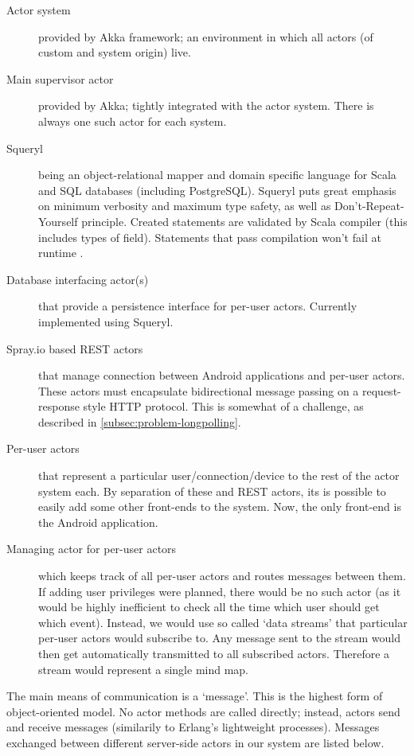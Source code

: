 \begin{description}
	\item[Actor system]{provided by Akka framework; an environment in which all actors (of custom and system origin) live.}
	\item[Main supervisor actor]{provided by Akka; tightly integrated with the actor system. There is always one such actor for each system.}
	\item[Squeryl]{being an object-relational mapper and domain specific language for Scala and SQL databases (including PostgreSQL). Squeryl puts great emphasis on minimum verbosity and maximum type safety, as well as Don't-Repeat-Yourself principle. Created statements are validated by Scala compiler (this includes types of field). Statements that pass compilation won't fail at runtime \cite{Squeryl:Intro}.}
	\item[Database interfacing actor(s)]{that provide a persistence interface for per-user actors. Currently implemented using Squeryl.}
	\item[Spray.io based REST actors]{that manage connection between Android applications and per-user actors. These actors must encapsulate bidirectional message passing on a request-response style HTTP protocol. This is somewhat of a challenge, as described in \cref{subsec:problem-longpolling}.}
	\item[Per-user actors]{that represent a particular user/connection/device to the rest of the actor system each. By separation of these and REST actors, its is possible to easily add some other front-ends to the system. Now, the only front-end is the Android application.}
	\item[Managing actor for per-user actors]{which keeps track of all per-user actors and routes messages between them. If adding user privileges were planned, there would be no such actor (as it would be highly inefficient to check all the time which user should get which event). Instead, we would use so called `data streams' that particular per-user actors would subscribe to. Any message sent to the stream would then get automatically transmitted to all subscribed actors. Therefore a stream would represent a single mind map.}
\end{description}

The main means of communication is a `message'. This is the highest form of object-oriented model. No actor methods are called directly; instead, actors send and receive messages (similarily to Erlang's lightweight processes). Messages exchanged between different server-side actors in our system are listed below.

